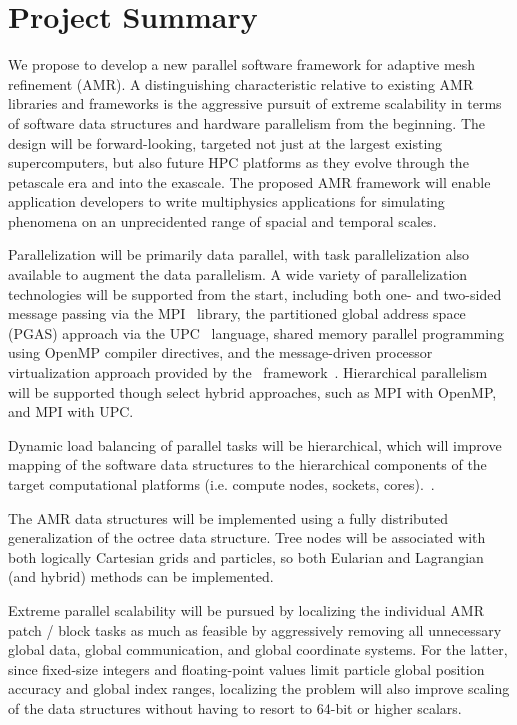 \documentclass[10pt]{article}
\begin{document}
\section{Project Summary}  \label{s:summary}


%
We propose to develop a new parallel software framework for adaptive
mesh refinement (AMR).  
%
A distinguishing characteristic relative to existing AMR libraries and
frameworks is the aggressive pursuit of extreme scalability in terms
of software data structures and hardware parallelism from the
beginning.
%
The design will be forward-looking, targeted not just at the largest
existing supercomputers, but also future HPC platforms as they evolve
through the petascale era and into the exascale.
%
The proposed AMR framework will enable application developers to
write multiphysics applications for simulating phenomena on an
unprecidented range of spacial and temporal scales.

%
Parallelization will be primarily data parallel, with task
parallelization also available to augment the data parallelism.
%
A wide variety of parallelization technologies will be supported from
the start, including both one- and two-sided message passing via the
MPI~\cite{wwwmpi} library, the partitioned global address space (PGAS)
approach via the UPC~\cite{@@@UPC} language, shared memory parallel
programming using OpenMP compiler directives, and the message-driven
processor virtualization approach provided by the \charm\
framework~\cite{@@@Charm}.
%
Hierarchical parallelism will be supported though select hybrid
approaches, such as MPI with OpenMP, and MPI with UPC.

%
Dynamic load balancing of parallel tasks will be hierarchical, which
will improve mapping of the software data structures to the
hierarchical components of the target computational platforms (i.e.
compute nodes, sockets, cores).~\cite{@@@LAN-DLB}.

%
The AMR data structures will be implemented using a fully distributed
generalization of the octree data structure.  Tree nodes will be
associated with both logically Cartesian grids and particles, so both
Eularian and Lagrangian (and hybrid) methods can be implemented.

%
Extreme parallel scalability will be pursued by localizing the
individual AMR patch / block tasks as much as feasible by aggressively
removing all unnecessary global data, global communication, and global
coordinate systems.  For the latter, since fixed-size integers and
floating-point values limit particle global position accuracy and
global index ranges, localizing the problem will also improve scaling
of the data structures without having to resort to 64-bit or higher
scalars.
\end{document}
